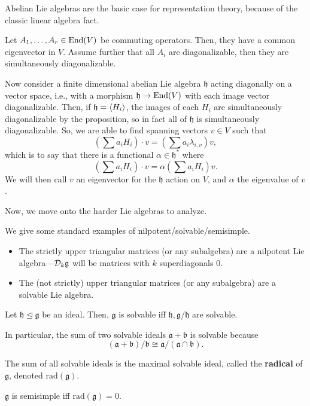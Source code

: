 \documentclass[12pt]{article}
\newcommand{\fg}{\mathfrak{g}}
\newcommand{\fh}{\mathfrak{h}}
\newcommand{\rad}{\mathrm{rad}}
\newcommand{\fa}{\mathfrak{a}}
\newcommand{\fb}{\mathfrak{b}}
\begin{document}
Abelian Lie algebras are the basic case for representation theory, because of the classic linear algebra fact.
\begin{prop}
    Let $A_1,\dots,A_r \in \operatorname{End}(V)$ be commuting operators. Then, they have a common eigenvector in $V$. Assume further that all $A_i$ are diagonalizable, then they are simultaneously diagonalizable.
\end{prop}
Now consider a finite dimensional abelian Lie algebra $\fh$ acting diagonally on a vector space, i.e., with a morphism $\fh \to \End(V)$ with each image vector diagonalizable. Then, if $\fh=\<H_i\>$, the images of each $H_i$ are simultaneously diagonalizable by the proposition, so in fact all of $\fh$ is simultaneously diagonalizable. So, we are able to find spanning vectors $v\in V$ such that
\[(\sum a_i H_i) \cdot v = (\sum a_i \lambda_{i,v}) v,\]
which is to say that there is a functional $\alpha \in \fh^*$ where
\[(\sum a_i H_i)\cdot v = \alpha(\sum a_i H_i) v.\]
We will then call $v$ an eigenvector for the $\fh$ action on $V$, and $\alpha$ the eigenvalue of $v$.

Now, we move onto the harder Lie algebras to analyze.

\begin{eg}
    We give some standard examples of nilpotent/solvable/semisimple.
    \begin{itemize}
        \item The strictly upper triangular matrices (or any subalgebra) are a nilpotent Lie algebra---$\cD_k \fg$ will be matrices with $k$ superdiagonals $0$.
        \item The (not strictly) upper triangular matrices (or any subalgebra) are a solvable Lie algebra.
    \end{itemize}
\end{eg}

\begin{prop}
    Let $\fh \trianglelefteq \fg$ be an ideal. Then, $\fg$ is solvable iff $\fh,\fg/\fh$ are solvable.

    In particular, the sum of two solvable ideals $\fa+\fb$ is solvable because
    \[(\fa + \fb)/\fb \cong \fa/(\fa \cap \fb).\]
\end{prop}

\begin{defn}
    The sum of all solvable ideals is the maximal solvable ideal, called the \textbf{radical} of $\fg$, denoted $\rad(\fg)$.
\end{defn}

\begin{prop}
    $\fg$ is semisimple iff $\rad(\fg)=0$.
\end{prop}
\end{document}
